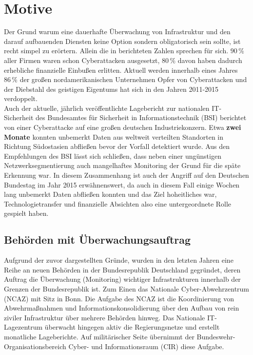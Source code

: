 \section{Motive}

Der Grund warum eine dauerhafte Überwachung von Infrastruktur und den darauf aufbauenden 
Diensten keine Option sondern obligatorisch sein sollte, ist recht simpel zu erörtern. 
Allein die in \cite[461]{francia} berichteten Zahlen sprechen für sich. $90\,\%$ aller 
Firmen waren schon Cyberattacken ausgesetzt, $80\,\%$ davon haben dadurch erhebliche 
finanzielle Einbußen erlitten. Aktuell werden innerhalb eines Jahres $86\,\%$ der großen 
nordamerikanischen Unternehmen Opfer von Cyberattacken und der Diebstahl des geistigen 
Eigentums hat sich in den Jahren 2011-2015 verdoppelt.\\
Auch der aktuelle, jährlich veröffentlichte Lagebericht zur nationalen IT-Sicherheit des
Bundesamtes für Sicherheit in Informationstechnik (BSI) \cite[12]{bsi-lagebericht} 
berichtet  
von einer Cyberattacke auf eine großen deutschen Industriekonzern. Etwa \textbf{zwei 
Monate} konnten unbemerkt Daten aus weltweit verteilten Standorten in Richtung 
Südostasien abfließen bevor der Vorfall detektiert wurde. Aus den Empfehlungen des BSI 
lässt sich schließen, dass neben einer ungünstigen Netzwerksegmentierung auch 
mangelhaftes Monitoring der Grund für die späte Erkennung war. In diesem Zusammenhang ist 
auch der Angriff auf den Deutschen Bundestag im Jahr 2015 erwähnenswert, da auch in 
diesem Fall einige Wochen lang unbemerkt Daten abfließen konnten und das Ziel 
hoheitliches war, Technologietransfer und finanzielle Absichten also eine untergeordnete 
Rolle gespielt haben.
\subsection{Behörden mit Überwachungsauftrag}

Aufgrund der zuvor dargestellten Gründe, wurden in den letzten Jahren eine Reihe an neuen 
Behörden in der Bundesrepublik Deutschland gegründet, deren Auftrag die Überwachung 
(Monitoring) wichtiger Infrastrukturen innerhalb der Grenzen der Bundesrepublik ist. Zum 
Einen das Nationale Cyber-Abwehrzentrum (NCAZ) \cite{web_ncaz} mit Sitz in Bonn. Die 
Aufgabe des NCAZ ist die Koordinierung von Abwehrmaßnahmen und Informationskonsolidierung 
über den Aufbau von rein ziviler Infrastruktur über mehrere Behörden hinweg. Das 
Nationale IT-Lagezentrum \cite{web_lagezentrum} überwacht hingegen aktiv die 
Regierungsnetze und erstellt monatliche Lageberichte. Auf militärischer Seite übernimmt 
der Bundeswehr-Organisationsbereich Cyber- und Informationsraum (CIR) diese Aufgabe.

